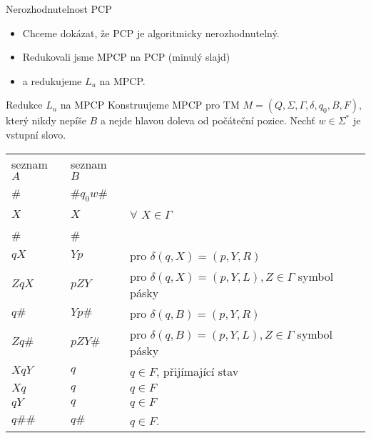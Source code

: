     \begin{frame}{Nerozhodnutelnost PCP }
    \vspace{-0.2cm}
    \begin{itemize}[<+->]
        \item Chceme dokázat, že PCP je algoritmicky nerozhodnutelný.
        \item Redukovali jsme MPCP na PCP (minulý slajd)
        \item a redukujeme $L_u$ na MPCP.
    \end{itemize}
    \vspace{-2mm}
    \begin{algm}{Redukce $L_u$ na MPCP}
    Konstruujeme MPCP pro TM  $M=(Q,\Sigma,\Gamma, \delta,q_0,B,F)$, který nikdy nepíše $B$ a nejde hlavou doleva od počáteční pozice.
    Nechť $w\in \Sigma^*$ je vstupní slovo.
    \pause
    \begin{tabular}{ l  l l}
     seznam $A$ & seznam $B$\\
    \# & \#$q_0w$\#\\
    \hline
    $X$ & $X$ & $\forall$ $X\in \Gamma$\\
    \# & \#\\
    \hline
    $qX$ & $Yp$ & pro $\delta(q,X)=(p,Y,R) $\\
    $ZqX$ & $pZY$ & pro $\delta(q,X)=(p,Y,L), Z \in \Gamma $ symbol pásky\\
    $q\#$ & $Yp\#$ & pro $\delta(q,B)=(p,Y,R) $\\
    $Zq\#$ & $pZY\#$ & pro $\delta(q,B)=(p,Y,L), Z \in \Gamma $ symbol pásky\\
    \hline
    $XqY$ & $q$& $q\in F$, přijímající stav\\
    $Xq$ & $q$& $q\in F$\\
    $qY$ & $q$& $q\in F$\\
    $q\#\#$ & $q\#$& $q\in F$.
    \end{tabular}
    \end{algm}
    \end{frame}
    
